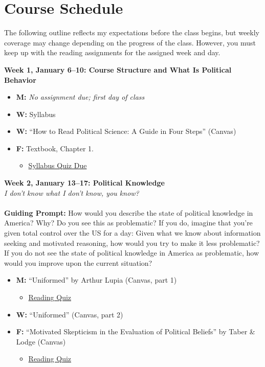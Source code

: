 \documentclass[11pt]{article}
\def\doubleq#1{``#1''}
\begin{document}
\section{Course Schedule}
The following outline reflects my expectations before the class begins, but weekly coverage may change depending on the progress of the class. However, you must keep up with the reading assignments for the assigned week and day. 

\textbf{Week 1, January 6--10: Course Structure and What Is Political Behavior}
\begin{itemize}
\item \textbf{M:} \textit{No assignment due; first day of class}
\item \textbf{W:} Syllabus 
\item \textbf{W:} \doubleq{How to Read Political Science: A Guide in Four Steps} (Canvas)
\item \textbf{F:} Textbook, Chapter 1. 
\begin{itemize}
\item \underline{Syllabus Quiz Due}
\end{itemize}

\end{itemize}
\textbf{Week 2, January 13--17: Political Knowledge}
\\
\textit{I don't know what I don't know, you know?}
\\\\
\textbf{Guiding Prompt:} How would you describe the state of political knowledge in America? Why? Do you see this as problematic? If you do, imagine that you’re given total control over the US for a day: Given what we know about information seeking and motivated reasoning, how would you try to make it less problematic? If you do not see the state of political knowledge in America as problematic, how would you improve upon the current situation? 
\begin{itemize}
\item \textbf{M:} \doubleq{Uniformed} by Arthur Lupia (Canvas, part 1)
\begin{itemize}
\item \underline{Reading Quiz}
\end{itemize} 
\item \textbf{W:} \doubleq{Uniformed} (Canvas, part 2)
\item \textbf{F:} \doubleq{Motivated Skepticism in the Evaluation of Political Beliefs} by Taber \& Lodge (Canvas)
\begin{itemize}
\item \underline{Reading Quiz}
\end{itemize}

\end{itemize}
\end{document}
